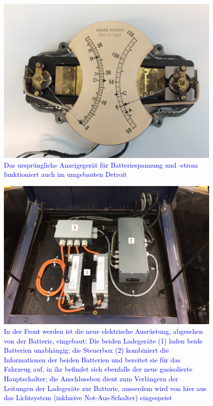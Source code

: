 \begin{landscape}
\begin{figure}[h]
		\includegraphics[width=1.30\textwidth]{images/Anhang/Volt_Ampere.jpg}
	\caption{\textcolor{blue}{Das ursprüngliche Anzeigegerät für Batteriespannung und -strom funktioniert auch im umgebauten Detroit}}
	\label{fig:Volt_Ampere}
\end{figure}
\begin{figure}[h]
	\centering
		\includegraphics[width=1.30\textwidth]{images/Anhang/Front.jpg}
	\caption{\textcolor{blue}{In der Front werden ist die neue elektrische Ausrüstung, abgesehen von der Batterie, eingebaut: Die beiden Ladegeräte (1) laden beide Batterien unabhängig; die Steuerbox (2) kombiniert die Informationen der beiden Batterien und bereitet sie für das Fahrzeug auf, in ihr befindet sich ebenfalls der neue gasisolierte Hauptschalter; die Anschlussbox dient zum Verlängern der Leitungen der Ladegeräte zur Batterie, ausserdem wird von hier aus das Lichtsystem (inklusive Not-Aus-Schalter) eingespeist}}
	\label{fig:Front}
\end{figure}
\newpage
	\end{landscape}

